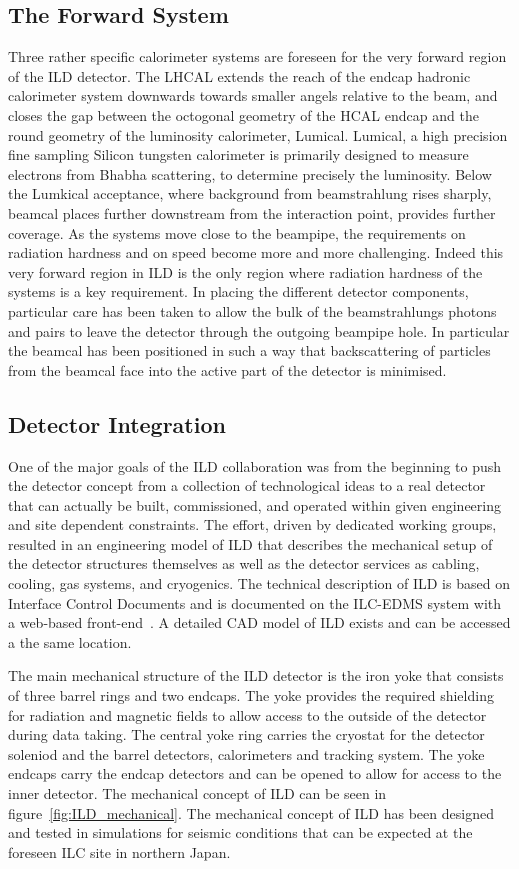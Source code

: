 \documentclass[%
 amsmath,amssymb,
 aps,
]{revtex4-1}
\begin{document}
\subsection{The Forward System}
Three rather specific calorimeter systems are foreseen for the very forward region of the ILD detector. The LHCAL extends the reach of the endcap hadronic calorimeter system downwards towards smaller angels relative to the beam, and closes the gap between the octogonal geometry of the HCAL endcap and the round geometry of the luminosity calorimeter, Lumical. Lumical, a high precision fine sampling Silicon tungsten calorimeter is primarily designed to measure electrons from Bhabha scattering, to determine precisely the luminosity. Below the Lumkical acceptance, where background from beamstrahlung rises sharply, beamcal places further downstream from the interaction point, provides further coverage. As the systems move close to the beampipe, the requirements on radiation hardness and on speed become more and more challenging. Indeed this very forward region in ILD is the only region where radiation hardness of the systems is a key requirement. In placing the different detector components, particular care has been taken to allow the bulk of the beamstrahlungs photons and pairs to leave the detector through the outgoing beampipe hole. In particular the beamcal has been positioned in such a way that backscattering of particles from the beamcal face into the active part of the detector is minimised.

\subsection{Detector Integration}
One of the major goals of the ILD collaboration was from the beginning to push the detector concept from a collection of technological ideas to a real detector that can actually be built, commissioned, and operated within given engineering and site dependent constraints. The effort, driven by dedicated working groups, resulted in an engineering model of ILD that describes the mechanical setup of the detector structures themselves as well as the detector services as cabling, cooling, gas systems, and cryogenics. The technical description of ILD is based on Interface Control Documents and is documented on the ILC-EDMS system with a web-based front-end~\cite{EDMS}. A detailed CAD model of ILD exists and can be accessed a the same location.

The main mechanical structure of the ILD detector is the iron yoke that consists of three barrel rings and two endcaps. The yoke provides the required shielding for radiation and magnetic fields to allow access to the outside of the detector during data taking. The central yoke ring carries the cryostat for the detector soleniod and the barrel detectors, calorimeters and tracking system. The yoke endcaps carry the endcap detectors and can be opened to allow for access to the inner detector. The mechanical concept of ILD can be seen in figure~\ref{fig:ILD_mechanical}. The mechanical concept of ILD has been designed and tested in simulations for seismic conditions that can be expected at the foreseen ILC site in northern Japan.
\end{document}
